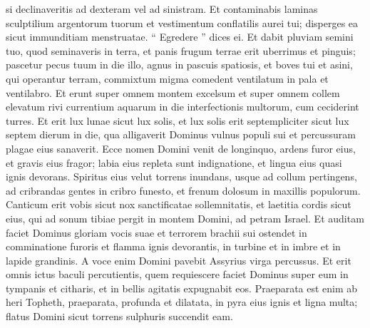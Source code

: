 \begin{biblechapter}
\begin{biblechapter}
\begin{biblechapter}
\begin{biblechapter}
\begin{biblechapter}
\begin{biblechapter}
\begin{biblechapter}
\begin{biblechapter}
\begin{biblechapter}
\begin{biblechapter}
\begin{biblechapter}
\begin{biblechapter}
\begin{biblechapter}
\begin{biblechapter}
\begin{biblechapter}
\begin{biblechapter}
\begin{biblechapter}
\begin{biblechapter}
\begin{biblechapter}
\begin{biblechapter}
\begin{biblechapter}
\begin{biblechapter}
\begin{biblechapter}
\begin{biblechapter}
\begin{biblechapter}
\begin{biblechapter}
\begin{biblechapter}
\begin{biblechapter}
\begin{biblechapter}
\begin{biblechapter}
 si declinaveritis ad dexteram vel ad sinistram.
 \verse Et contaminabis laminas sculptilium argentorum tuorum
 et vestimentum conflatilis aurei tui;
 disperges ea sicut immunditiam menstruatae.
 “ Egredere ” dices ei.
 \verse Et dabit pluviam semini tuo,
 quod seminaveris in terra,
 et panis frugum terrae erit uberrimus et pinguis;
 pascetur pecus tuum in die illo, agnus in pascuis spatiosis,
 \verse et boves tui et asini, qui operantur terram,
 commixtum migma comedent
 ventilatum in pala et ventilabro.
 \verse Et erunt super omnem montem excelsum
 et super omnem collem elevatum
 rivi currentium aquarum
 in die interfectionis multorum,
 cum ceciderint turres.
 \verse Et erit lux lunae sicut lux solis,
 et lux solis erit septempliciter sicut lux septem dierum
 in die, qua alligaverit Dominus vulnus populi sui
 et percussuram plagae eius sanaverit.
 \verse Ecce nomen Domini venit de longinquo,
 ardens furor eius, et gravis eius fragor;
 labia eius repleta sunt indignatione,
 et lingua eius quasi ignis devorans.
 \verse Spiritus eius velut torrens inundans,
 usque ad collum pertingens,
 ad cribrandas gentes in cribro funesto,
 et frenum dolosum in maxillis populorum.
 \verse Canticum erit vobis
 sicut nox sanctificatae sollemnitatis,
 et laetitia cordis
 sicut eius, qui ad sonum tibiae pergit
 in montem Domini,
 ad petram Israel.
 \verse Et auditam faciet Dominus
 gloriam vocis suae
 et terrorem brachii sui
 ostendet in comminatione furoris
 et flamma ignis devorantis,
 in turbine et in imbre et in lapide grandinis.
 \verse A voce enim Domini pavebit
 Assyrius virga percussus.
 \verse Et erit omnis ictus baculi percutientis,
 quem requiescere faciet Dominus
 super eum in tympanis et citharis,
 et in bellis agitatis expugnabit eos.
 \verse Praeparata est enim ab heri Topheth,
 praeparata, profunda et dilatata,
 in pyra eius ignis et ligna multa;
 flatus Domini sicut torrens sulphuris
 succendit eam.
 

\end{biblechapter}
\end{biblechapter}
\end{biblechapter}
\end{biblechapter}
\end{biblechapter}
\end{biblechapter}
\end{biblechapter}
\end{biblechapter}
\end{biblechapter}
\end{biblechapter}
\end{biblechapter}
\end{biblechapter}
\end{biblechapter}
\end{biblechapter}
\end{biblechapter}
\end{biblechapter}
\end{biblechapter}
\end{biblechapter}
\end{biblechapter}
\end{biblechapter}
\end{biblechapter}
\end{biblechapter}
\end{biblechapter}
\end{biblechapter}
\end{biblechapter}
\end{biblechapter}
\end{biblechapter}
\end{biblechapter}
\end{biblechapter}
\end{biblechapter}
